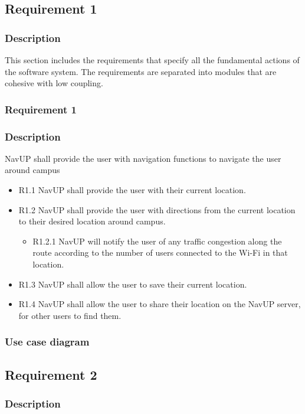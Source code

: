\documentclass{article}
\begin{document}
    	\subsection{Requirement 1}
    	\subsubsection{Description}
    This section includes the requirements that specify all the fundamental actions of the software system. The requirements are separated into modules that are cohesive with low coupling.
    
    
    \subsubsection{Requirement 1}
    	\subsubsection*{Description}
    	NavUP shall provide the user with navigation functions to navigate the user around campus
        \begin{itemize}
        \item R1.1 NavUP shall provide the user with their current location.
        \item R1.2 NavUP shall provide the user with directions from the current location to their desired location around campus.
            \begin{itemize}
                \item R1.2.1 NavUP will notify the user of any traffic congestion along the route according to the number of users connected to the Wi-Fi in that location.
            \end{itemize}
        \item R1.3 NavUP shall allow the user to save their current location.
        \item R1.4 NavUP shall allow the user to share their location on the NavUP server, for other users to find them.
        \end{itemize}

        \subsubsection{Use case diagram}
        \subsection{Requirement 2}
        \subsubsection{Description}
\end{document}
